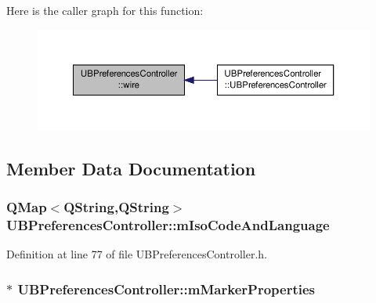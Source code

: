 Here is the caller graph for this function\-:
\nopagebreak
\begin{figure}[H]
\begin{center}
\leavevmode
\includegraphics[width=350pt]{d3/d33/class_u_b_preferences_controller_ad58e84c5ae34f18622453060ac927ac1_icgraph}
\end{center}
\end{figure}




\subsection{Member Data Documentation}
\hypertarget{class_u_b_preferences_controller_a75b09fdffc0b761d3b18565a8e2f0605}{
\subsubsection[{m\-Iso\-Code\-And\-Language}]{\setlength{\rightskip}{0pt plus 5cm}Q\-Map$<$Q\-String,Q\-String$>$ U\-B\-Preferences\-Controller\-::m\-Iso\-Code\-And\-Language\hspace{0.3cm}{\ttfamily [protected]}}}\label{d3/d33/class_u_b_preferences_controller_a75b09fdffc0b761d3b18565a8e2f0605}


Definition at line 77 of file U\-B\-Preferences\-Controller.\-h.

\hypertarget{class_u_b_preferences_controller_abfffcb36c3b9e5e3305329d0adb0e790}{
\subsubsection[{m\-Marker\-Properties}]{$\ast$ U\-B\-Preferences\-Controller\-::m\-Marker\-Properties\hspace{0.3cm}{\ttfamily [protected]}}}\label{d3/d33/class_u_b_preferences_controller_abfffcb36c3b9e5e3305329d0adb0e790}


